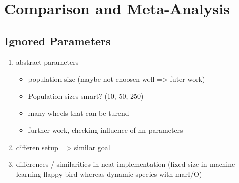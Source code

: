 

\chapter{Comparison and Meta-Analysis}
\label{sec:compare}

\section{Ignored Parameters}
\label{sec:compare:params}	
	\begin{enumerate}
		\item abstract parameters
		\begin{itemize}
			\item population size (maybe not choosen well => futer work)
			\item Population sizes smart? (10, 50, 250)
			\item many wheels that can be turend
			\item further work, checking influence of nn parameters
		\end{itemize}
		\item differen setup => similar goal
		\item differences / similarities in neat implementation (fixed size in machine learning flappy bird whereas dynamic species with marI/O)
	\end{enumerate}

